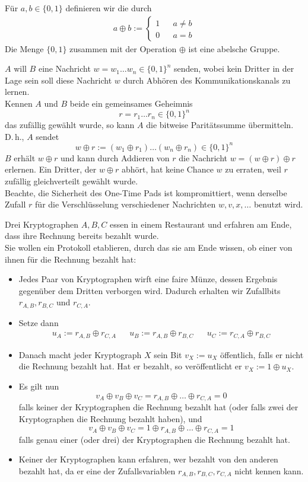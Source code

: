 \Def{}
Für $a,b\in \{0,1\}$ definieren wir die  durch
\begin{align*}
a \oplus b := \left\lbrace
\begin{aligned}
1 && a\neq b\\
0 && a = b
\end{aligned}
\right.
\end{align*}
Die Menge $\{0,1\}$ zusammen mit der Operation $\oplus$ ist eine abelsche Gruppe.

$A$ will $B$ eine Nachricht $w = w_1\ldots w_n \in \{0,1\}^n$ senden, wobei kein Dritter in der Lage sein soll diese Nachricht $w$ durch Abhören des Kommunikationskanals zu lernen.\\
Kennen $A$ und $B$ beide ein gemeinsames Geheimnis
\[r = r_1\ldots r_n \in \{0,1\}^n \]
das zufällig gewählt wurde, so kann $A$ die bitweise Paritätssumme übermitteln. D.\,h., $A$ sendet
\[ w \oplus r := (w_1\oplus r_1)\ldots (w_n\oplus r_n) \in \{0,1\}^n \]
$B$ erhält $w\oplus r$ und kann durch Addieren von $r$ die Nachricht $w = (w\oplus r) \oplus r$ erlernen. Ein Dritter, der $w\oplus r$ abhört, hat keine Chance $w$ zu erraten, weil $r$ zufällig gleichverteilt gewählt wurde.\\
Beachte, die Sicherheit des One-Time Pads ist kompromittiert, wenn derselbe Zufall $r$ für die Verschlüsselung verschiedener Nachrichten $w,v,x, \ldots$ benutzt wird.

Drei Kryptographen $A,B,C$ essen in einem Restaurant und erfahren am Ende, dass ihre Rechnung bereits bezahlt wurde.\\
Sie wollen ein Protokoll etablieren, durch das sie am Ende wissen, ob einer von ihnen für die Rechnung bezahlt hat:
\begin{itemize}
	\item Jedes Paar von Kryptographen wirft eine faire Münze, dessen Ergebnis gegenüber dem Dritten verborgen wird. Dadurch erhalten wir Zufallbits $r_{A,B}, r_{B,C}$ und $r_{C,A}$.
	\item Setze dann
	\begin{align*}
	u_A := r_{A,B} \oplus r_{C,A} && u_B := r_{A,B} \oplus r_{B,C} && u_C := r_{C,A} \oplus r_{B,C}
	\end{align*}
	\item Danach macht jeder Kryptograph $X$ sein Bit $v_X := u_X$ öffentlich, falls er nicht die Rechnung bezahlt hat. Hat er bezahlt, so veröffentlicht er $v_X:=1 \oplus u_X$.
	\item Es gilt nun
	\[ v_A \oplus v_B \oplus v_C = r_{A,B} \oplus \ldots \oplus r_{C,A}= 0 \]
	falls keiner der Kryptographen die Rechnung bezahlt hat (oder falls zwei der Kryptographen die Rechnung bezahlt haben), und
	\[ v_A \oplus v_B \oplus v_C = 1\oplus r_{A,B} \oplus \ldots \oplus r_{C,A}= 1  \]
	falls genau einer (oder drei) der Kryptographen die Rechnung bezahlt hat.
	\item Keiner der Kryptographen kann erfahren, wer bezahlt von den anderen bezahlt hat, da er eine der Zufallsvariablen $r_{A,B}, r_{B,C}, r_{C,A}$ nicht kennen kann.
\end{itemize}


